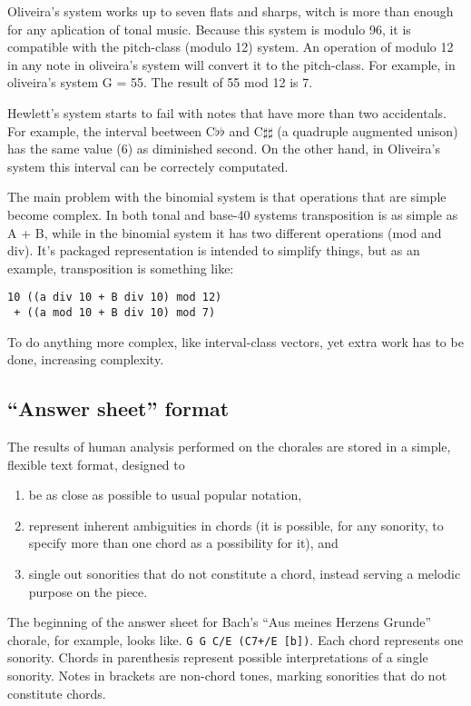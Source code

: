 \documentclass{article}
\begin{document}
Oliveira's system works up to seven flats and sharps, witch is more
than enough for any aplication of tonal music. Because this system is
modulo 96, it is compatible with the pitch-class (modulo 12) system.
An operation of modulo 12 in any note in oliveira's system will
convert it to the pitch-class. For example, in oliveira's system G =
55. The result of 55 mod 12 is 7.

Hewlett's system starts to fail with notes that have more than two
accidentals. For example, the interval beetween C$\flat\flat$ and
C$\sharp\sharp$ (a quadruple augmented unison) has the same value (6)
as diminished second. On the other hand, in Oliveira's system this
interval can be correctely computated.

The main problem with the binomial system is that operations that are
simple become complex. In both tonal and base-40 systems transposition
is as simple as A + B, while in the binomial system it has two
different operations (mod and div). It's packaged representation is
intended to simplify things, but as an example, transposition is
something like:

\begin{verbatim}
10 ((a div 10 + B div 10) mod 12)
 + ((a mod 10 + B div 10) mod 7)
\end{verbatim}

To do anything more complex, like interval-class vectors, yet extra
work has to be done, increasing complexity.

\subsection{``Answer sheet'' format}
\label{sec:formato-dos-acordes}

The results of human analysis performed on the chorales are stored in
a simple, flexible text format, designed to

\begin{enumerate}
\item be as close as possible to
usual popular notation,
\item represent inherent ambiguities in chords (it is possible, for
  any sonority, to specify more than one chord as a possibility for
  it), and
\item single out sonorities that do not constitute a chord, instead
  serving a melodic purpose on the piece.
\end{enumerate}

The beginning of the answer sheet for Bach's ``Aus meines Herzens
Grunde'' chorale, for example, looks like. \texttt{G G C/E (C7+/E
  [b])}. Each chord represents one sonority. Chords in parenthesis
represent possible interpretations of a single sonority. Notes in
brackets are non-chord tones, marking sonorities that do not
constitute chords.
\end{document}
